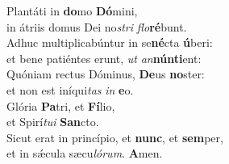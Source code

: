 \oddverse Plantáti in \textbf{do}mo \textbf{Dó}mini,~\*\\
\oddverse in átriis domus Dei no\textit{stri} \textit{flo}\textbf{ré}bunt.\\
\evenverse Adhuc multiplicabúntur in se\textbf{né}cta \textbf{ú}beri:~\*\\
\evenverse et bene patiéntes erunt, \textit{ut} \textit{an}\textbf{nún}\textbf{ti}ent:\\
\oddverse Quóniam rectus Dóminus, \textbf{De}us \textbf{no}ster:~\*\\
\oddverse et non est iníqui\textit{tas} \textit{in} \textbf{e}o.\\
\evenverse Glória \textbf{Pa}tri, et \textbf{Fí}lio,~\*\\
\evenverse et Spirí\textit{tu}\textit{i} \textbf{San}cto.\\
\oddverse Sicut erat in princípio, et \textbf{nunc}, et \textbf{sem}per,~\*\\
\oddverse et in sǽcula sæcu\textit{ló}\textit{rum}. \textbf{A}men.\\

